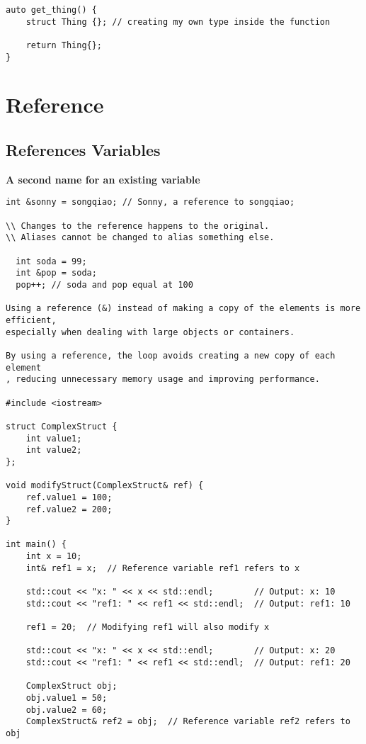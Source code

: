 \documentclass[openany]{report}
\begin{document}
\begin{verbatim}
auto get_thing() {
    struct Thing {}; // creating my own type inside the function 

    return Thing{};
}
\end{verbatim}

\section{Reference}
\subsection{References Variables}

\textbf{A second name for an existing variable}

\begin{verbatim}
int &sonny = songqiao; // Sonny, a reference to songqiao;

\\ Changes to the reference happens to the original.
\\ Aliases cannot be changed to alias something else.

  int soda = 99;
  int &pop = soda;
  pop++; // soda and pop equal at 100

Using a reference (&) instead of making a copy of the elements is more efficient,
especially when dealing with large objects or containers. 

By using a reference, the loop avoids creating a new copy of each element
, reducing unnecessary memory usage and improving performance.

#include <iostream>

struct ComplexStruct {
    int value1;
    int value2;
};

void modifyStruct(ComplexStruct& ref) {
    ref.value1 = 100;
    ref.value2 = 200;
}

int main() {
    int x = 10;
    int& ref1 = x;  // Reference variable ref1 refers to x

    std::cout << "x: " << x << std::endl;        // Output: x: 10
    std::cout << "ref1: " << ref1 << std::endl;  // Output: ref1: 10

    ref1 = 20;  // Modifying ref1 will also modify x

    std::cout << "x: " << x << std::endl;        // Output: x: 20
    std::cout << "ref1: " << ref1 << std::endl;  // Output: ref1: 20

    ComplexStruct obj;
    obj.value1 = 50;
    obj.value2 = 60;
    ComplexStruct& ref2 = obj;  // Reference variable ref2 refers to obj


\end{verbatim}
\end{document}
